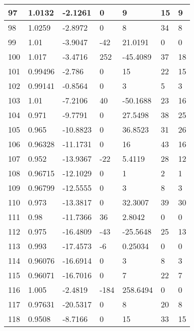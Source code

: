 \begin{tabular}{|l|l|l|l|l|l|l|}
97&1.0132&-2.1261&0&9&15&9\\\hline
98&1.0259&-2.8972&0&8&34&8\\\hline
99&1.01&-3.9047&-42&21.0191&0&0\\\hline
100&1.017&-3.4716&252&-45.4089&37&18\\\hline
101&0.99496&-2.786&0&15&22&15\\\hline
102&0.99141&-0.8564&0&3&5&3\\\hline
103&1.01&-7.2106&40&-50.1688&23&16\\\hline
104&0.971&-9.7791&0&27.5498&38&25\\\hline
105&0.965&-10.8823&0&36.8523&31&26\\\hline
106&0.96328&-11.1731&0&16&43&16\\\hline
107&0.952&-13.9367&-22&5.4119&28&12\\\hline
108&0.96715&-12.1029&0&1&2&1\\\hline
109&0.96799&-12.5555&0&3&8&3\\\hline
110&0.973&-13.3817&0&32.3007&39&30\\\hline
111&0.98&-11.7366&36&2.8042&0&0\\\hline
112&0.975&-16.4809&-43&-25.5648&25&13\\\hline
113&0.993&-17.4573&-6&0.25034&0&0\\\hline
114&0.96076&-16.6914&0&3&8&3\\\hline
115&0.96071&-16.7016&0&7&22&7\\\hline
116&1.005&-2.4819&-184&258.6494&0&0\\\hline
117&0.97631&-20.5317&0&8&20&8\\\hline
118&0.9508&-8.7166&0&15&33&15\\\hline
\end{tabular}

